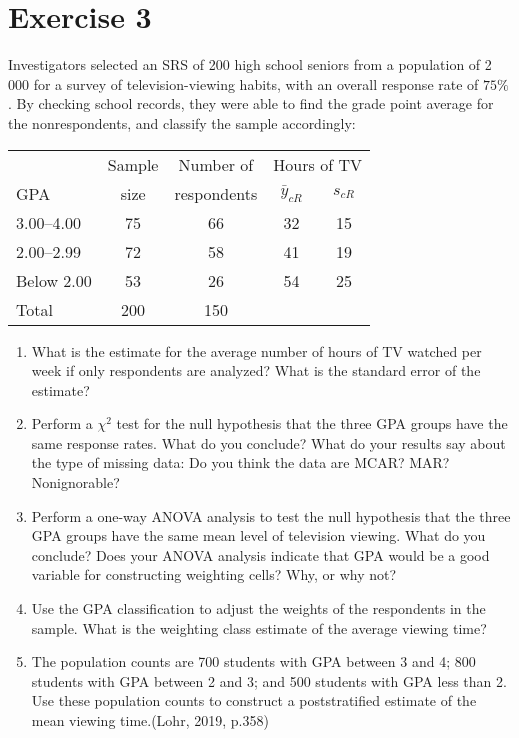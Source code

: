 \documentclass[12pt]{article}
\begin{document}
\section*{Exercise 3}
Investigators selected an SRS of 200 high school seniors from a population of 2 000
for a survey of television-viewing habits, with an overall response rate of $75\%$. By
checking school records, they were able to find the grade point average for the nonrespondents,
and classify the sample accordingly: 
\begin{center}
\begin{tabular}{lcccc}
& Sample & Number of & \multicolumn{2}{c}{Hours of TV}\\
GPA& size & respondents & $\bar{y}_{cR}$ & $s_{cR}$ \\
\hline
3.00–4.00 & 75& 66& 32& 15\\
2.00–2.99& 72& 58& 41& 19\\
Below 2.00& 53& 26& 54& 25\\
\hline
Total & 200 & 150 && \\
\end{tabular}
\end{center}
\begin{enumerate}
\item What is the estimate for the average number of hours of TV watched per week if
only respondents are analyzed? What is the standard error of the estimate?
\item Perform a $\chi^2$ test for the null hypothesis that the three GPA groups have the same
response rates. What do you conclude? What do your results say about the type of missing data: Do you think the data are MCAR? MAR? Nonignorable?
\item Perform a one-way ANOVA analysis to test the null hypothesis that the three GPA groups have the same mean level of television viewing. What do you conclude?
Does your ANOVA analysis indicate that GPA would be a good variable for constructing weighting cells? Why, or why not?
\item Use the GPA classification to adjust the weights of the respondents in the sample. What is the weighting class estimate of the average viewing time?
\item The population counts are 700 students with GPA between 3 and 4; 800 students with GPA between 2 and 3; and 500 students with GPA less than 2. Use these
population counts to construct a poststratified estimate of the mean viewing time.\hfill (Lohr, 2019, p.358)
\end{enumerate}
\end{document}
